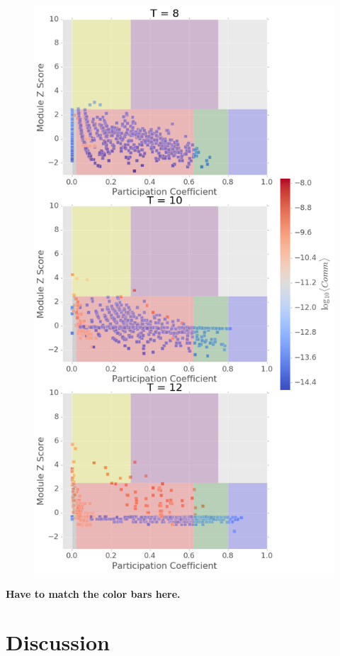 \documentclass[%
 reprint,
 amsmath,amssymb,
 aps,
]{revtex4-2}
\begin{document}
\begin{figure}[h]
	\centering
	\includegraphics[width=1\linewidth]{figure/guimera_combine}
	\caption{}
	\label{fig:guimera_combine}
\end{figure}

\textbf{Have to match the color bars here.}


\newpage
\section{\label{sec:level1} Discussion}
\end{document}
